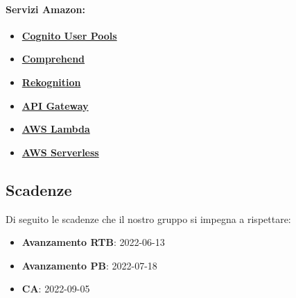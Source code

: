 	\paragraph{\textbf{Servizi Amazon:}} 
\begin{itemize}
	\item
	\href {https://docs.aws.amazon.com/cognito/latest/developerguide/cognito-user-identity-pools.html}{\textbf{Cognito User Pools}}
	\item
	\href{https://docs.aws.amazon.com/comprehend/latest/dg/what-is.html}{\textbf{Comprehend}}
	\item 
	\href{https://docs.aws.amazon.com/rekognition/latest/dg/what-is.html}{\textbf{Rekognition}}
	\item 
	\href{https://docs.aws.amazon.com/apigateway/latest/developerguide/welcome.html}{\textbf{API Gateway}}
	\item
	\href{https://docs.aws.amazon.com/lambda/latest/dg/welcome.html}{\textbf{AWS Lambda}}
	\item 
	\href{https://docs.aws.amazon.com/serverless-application-model/latest/developerguide/what-is-sam.html}{\textbf{AWS Serverless}}
\end{itemize}

\subsection{Scadenze}
Di seguito le scadenze che il nostro gruppo si impegna a rispettare:
\begin{itemize}
	\item \textbf{Avanzamento RTB}: 2022-06-13
	\item \textbf{Avanzamento PB}: 2022-07-18
	\item \textbf{CA}: 2022-09-05
\end{itemize}
